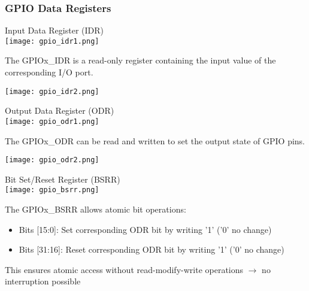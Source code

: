 \subsubsection{GPIO Data Registers}



\begin{concept}{Input Data Register (IDR)}\\
    \texttt{[image: gpio\_idr1.png]}

    \begin{minipage}{0.5\linewidth}
    The GPIOx\_IDR is a read-only register containing the input value of the corresponding I/O port.
    \end{minipage}
    \hspace{3mm}
    \begin{minipage}{0.4\linewidth}
        \texttt{[image: gpio\_idr2.png]}
    \end{minipage}
\end{concept}

\begin{concept}{Output Data Register (ODR)}\\
    \texttt{[image: gpio\_odr1.png]}

    \begin{minipage}{0.5\linewidth}
    The GPIOx\_ODR can be read and written to set the output state of GPIO pins.
    \end{minipage}
    \hspace{3mm}
    \begin{minipage}{0.4\linewidth}
    \texttt{[image: gpio\_odr2.png]}
    \end{minipage}
\end{concept}



\begin{concept}{Bit Set/Reset Register (BSRR)}\\
    \texttt{[image: gpio\_bsrr.png]}

The GPIOx\_BSRR allows atomic bit operations:
\begin{itemize}
    \item Bits [15:0]: Set corresponding ODR bit by writing '1' ('0' no change)
    \item Bits [31:16]: Reset corresponding ODR bit by writing '1' ('0' no change)
\end{itemize}
This ensures atomic access without read-modify-write operations $\rightarrow$ no interruption possible
\end{concept}

